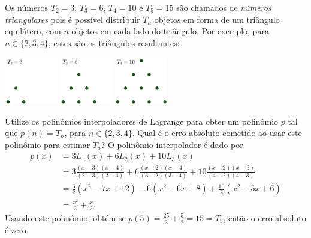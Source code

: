 \documentclass[12pt,a4paper]{article}
\begin{document}
\begin{ExerciseList}
\Exercise[title={2,5}]
Os números $T_2 = 3$, $T_3 = 6$, $T_4 = 10$ e $T_5 = 15$ são chamados de \textit{números triangulares} pois é possível distribuir $T_n$ objetos em forma de um triângulo equilátero, com $n$ objetos em cada lado do triângulo. Por exemplo, para $n \in \{2, 3, 4\}$, estes são os triângulos resultantes:
\begin{center}
\includegraphics[width=2.3cm]{img/prova-2-pro-t2.pdf}
\includegraphics[width=2.3cm]{img/prova-2-pro-t3.pdf}
\includegraphics[width=2.3cm]{img/prova-2-pro-t4.pdf}
\end{center}

Utilize os polinômios interpoladores de Lagrange para obter um polinômio $p$ tal que $p(n) = T_n$, para $n \in \{2,3,4\}$. Qual é o erro absoluto cometido ao usar este polinômio para estimar $T_5$?
\Answer O polinômio interpolador é dado por
\begin{align*}
p(x)
& = 3 L_1(x)+ 6L_2(x)+ 10L_3(x) \\
& = 3 \frac{(x-3)(x-4)}{(2-3)(2-4)}
  + 6 \frac{(x-2)(x-4)}{(3-2)(3-4)}
 + 10 \frac{(x-2)(x-3)}{(4-2)(4-3)} \\
& = \frac{3}{2}(x^2 - 7 x + 12)
  - 6 (x^2 - 6 x + 8)
  + \frac{10}{2} (x^2 - 5x + 6)\\
& = \frac{x^2}{2} + \frac{x}{2}.
\end{align*}
Usando este polinômio, obtém-se $p(5) = \frac{25}{2} + \frac{5}{2} = 15 = T_5$, então o erro absoluto é zero.


\end{ExerciseList}
\end{document}
